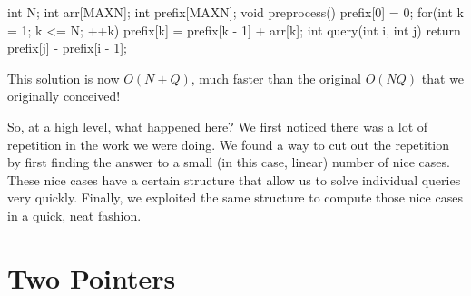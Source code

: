 \begin{mylstlisting}
int N;
int arr[MAXN];
int prefix[MAXN];
void preprocess() {
	prefix[0] = 0;
	for(int k = 1; k <= N; ++k)
		prefix[k] = prefix[k - 1] + arr[k];
}
int query(int i, int j) {
	return prefix[j] - prefix[i - 1];
}
\end{mylstlisting}

This solution is now $O(N + Q)$, much faster than the original $O(NQ)$ that we originally conceived!

So, at a high level, what happened here? We first noticed there was a lot of repetition in the work we were doing. We found a way to cut out the repetition by first 
finding the answer to a small (in this case, linear) number of nice cases. These nice cases have a certain structure that allow us to solve individual queries very quickly.
Finally, we exploited the same structure to compute those nice cases in a quick, neat fashion.

\section{Two Pointers}

